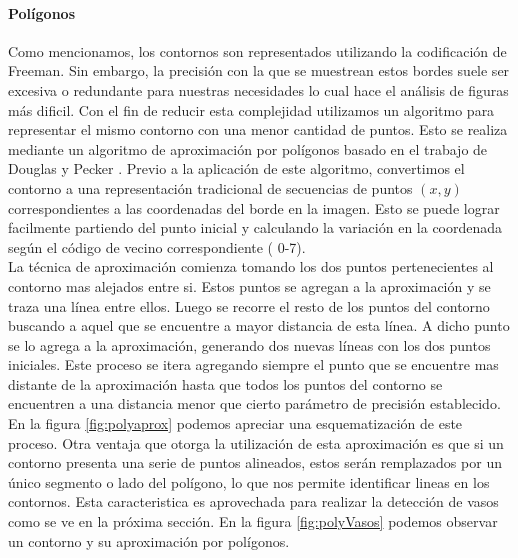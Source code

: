 		
	\paragraph{Polígonos}
	Como mencionamos, los contornos son representados utilizando la codificación de Freeman. Sin embargo, la precisión con la que se muestrean estos bordes suele ser excesiva o redundante para nuestras
	necesidades lo cual hace el análisis de figuras más dificil. Con el fin de reducir esta complejidad utilizamos un algoritmo
	para representar el mismo contorno con una menor cantidad de puntos. Esto se realiza mediante un algoritmo de aproximación por polígonos
	basado en el trabajo de Douglas y Pecker \cite{dp74}. Previo a la aplicación de este algoritmo, convertimos el contorno a una representación
	tradicional de secuencias de puntos $(x,y)$ correspondientes a las 
	coordenadas del borde en la imagen. Esto se puede lograr facilmente partiendo del punto inicial y calculando la variación en la coordenada según el código de vecino correspondiente ( 0-7).\\
	\indent La técnica de aproximación comienza tomando los dos puntos 
	pertenecientes al contorno mas alejados entre si. Estos puntos se 
	agregan a la aproximación y se traza una línea entre ellos.
	Luego se recorre el resto de los puntos del contorno buscando a aquel 
	que se encuentre a mayor distancia de esta línea. A dicho punto se lo 
	agrega a la aproximación, generando dos nuevas líneas con los dos puntos iniciales. Este proceso se itera agregando siempre el punto que se encuentre mas distante de la aproximación hasta que todos los puntos del contorno se encuentren a una distancia menor que cierto parámetro 
	de precisión establecido. En la figura \ref{fig:polyaprox} podemos apreciar una esquematización de este proceso. Otra ventaja que 
	otorga la utilización de esta aproximación es que si un contorno presenta una serie de puntos alineados, estos serán remplazados por un 
	único segmento o lado del polígono, lo que nos permite identificar lineas en los contornos. Esta caracteristica es aprovechada para
	realizar la detección de vasos como se ve en la próxima sección. En la figura \ref{fig:polyVasos} podemos observar un contorno
	y su aproximación por polígonos.
	
